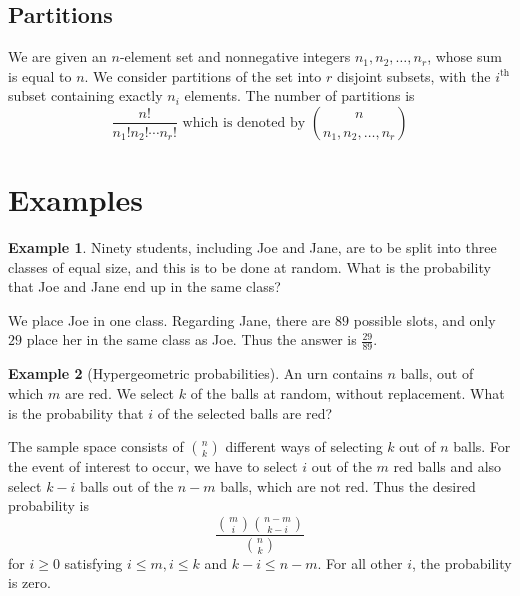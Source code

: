 \documentclass{tufte-handout}
\theoremstyle{definition} \newtheorem{definition}{Definition}
\theoremstyle{definition} \newtheorem{remark}{Remark}
\theoremstyle{definition} \newtheorem{example}{Example}
\begin{document}
\subsection{Partitions}
We are given an $n$-element set and nonnegative integers
$n_1, n_2, \ldots, n_r$, whose sum is equal to $n$. We consider partitions
of the set into $r$ disjoint subsets, with the $i^{\text{th}}$ subset
containing exactly $n_i$ elements. The number of partitions is
\begin{equation*}
  \frac{n!}{n_1! n_2! \cdots n_r!} \text{ which is denoted by }
  \binom{n}{n_1, n_2, \ldots, n_r}
\end{equation*}

\section{Examples}
\begin{example}
  Ninety students, including Joe and Jane, are to be split into three
  classes of equal size, and this is to be done at random. What is the
  probability that Joe and Jane end up in the same class?
\end{example}

 We place Joe in one class. Regarding Jane, there are $89$ possible
 slots, and only $29$ place her in the same class as Joe. Thus the
 answer is $\frac{29}{89}$.

 \begin{example}[Hypergeometric probabilities]
   An urn contains $n$ balls, out of which $m$ are red. We select $k$ of
   the balls at random, without replacement. What is the probability that
   $i$ of the selected balls are red?
 \end{example}

 The sample space consists of $\binom{n}{k}$ different ways of selecting
 $k$ out of $n$ balls. For the event of interest to occur, we have to
 select $i$ out of the $m$ red balls and also select $k - i$ balls out of
 the $n - m$ balls, which are not red. Thus the desired probability is
 \begin{equation*}
   \frac{\binom{m}{i} \binom{n - m}{k - i}}{\binom{n}{k}}
 \end{equation*}
 for $i \geq 0$ satisfying $i \leq m, i \leq k$ and $k - i \leq n - m$.
 For all other $i$, the probability is zero.
\end{document}
